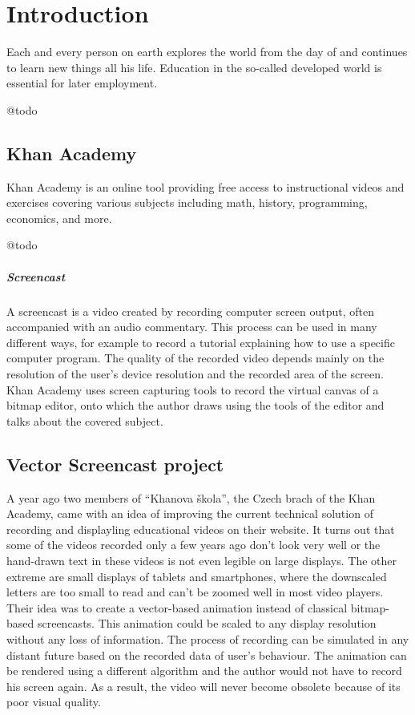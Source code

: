 \chapter*{Introduction}
Each and every person on earth explores the world from the day of and continues to learn new things all his life. Education in the so-called developed world is essential for later employment.

@todo 

\section*{Khan Academy}
Khan Academy is an online tool providing free access to instructional videos and exercises covering various subjects including math, history, programming, economics, and more.

@todo

\paragraph{Screencast}
A screencast is a video created by recording computer screen output, often accompanied with an audio commentary. This process can be used in many different ways, for example to record a tutorial explaining how to use a specific computer program. The quality of the recorded video depends mainly on the resolution of the user's device resolution and the recorded area of the screen. Khan Academy uses screen capturing tools to record the virtual canvas of a bitmap editor, onto which the author draws using the tools of the editor and talks about the covered subject.

\section*{Vector Screencast project}
A year ago two members of ``Khanova škola'', the Czech brach of the Khan Academy, came with an idea of improving the current technical solution of recording and displayling educational videos on their website. It turns out that some of the videos recorded only a few years ago don't look very well or the hand-drawn text in these videos is not even legible on large displays. The other extreme are small displays of tablets and smartphones, where the downscaled letters are too small to read and can't be zoomed well in most video players. Their idea was to create a vector-based animation instead of classical bitmap-based screencasts. This animation could be scaled to any display resolution without any loss of information. The process of recording can be simulated in any distant future based on the recorded data of user's behaviour. The animation can be rendered using a different algorithm and the author would not have to record his screen again. As a result, the video will never become obsolete because of its poor visual quality.

